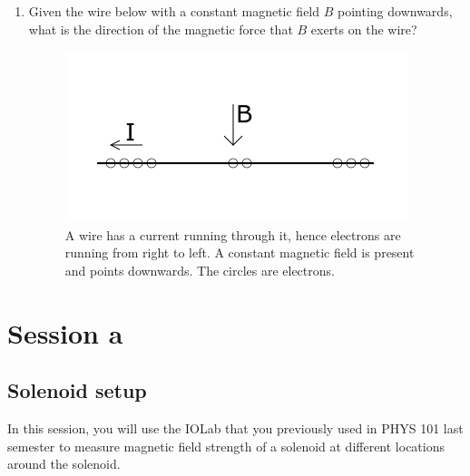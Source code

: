 \documentclass[12pt]{report}
\begin{document}
\begin{enumerate}
\item Given the wire below with a constant magnetic field $B$ pointing downwards, what is the direction of the magnetic force that $B$ exerts on the wire?

\begin{figure}[h]
\centering
\includegraphics[scale=0.85]{lab3-wire-bfield-force}
\caption{A wire has a current running through it, hence electrons are running from right to left. A constant magnetic field is present and points downwards. The circles are electrons.}
\end{figure}

\end{enumerate}

\section{Session a}
\subsection{Solenoid setup}
In this session, you will use the IOLab that you previously used in PHYS 101 last semester to measure magnetic field strength of a solenoid at different locations around the solenoid.
\end{document}
